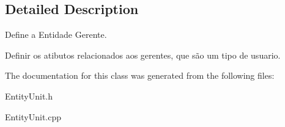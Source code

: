 \subsection{Detailed Description}
Define a Entidade Gerente. 

Definir os atibutos relacionados aos gerentes, que são um tipo de usuario. 

The documentation for this class was generated from the following files\-:\begin{DoxyCompactItemize}
\item 
Entity\-Unit.\-h\item 
Entity\-Unit.\-cpp\end{DoxyCompactItemize}

